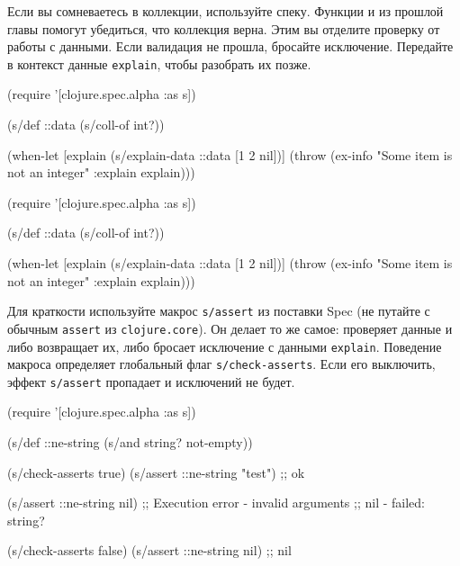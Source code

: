 
Если вы сомневаетесь в коллекции, используйте спеку. Функции  и
 из прошлой главы  помогут убедиться, что
коллекция верна. Этим вы отделите проверку от работы с данными. Если валидация
не прошла, бросайте исключение. Передайте в контекст данные \verb|explain|,
чтобы разобрать их позже.

\ifnarrow

\begin{english}
  \begin{clojure}
(require '[clojure.spec.alpha :as s])

(s/def ::data (s/coll-of int?))

(when-let [explain (s/explain-data
                     ::data
                     [1 2 nil])]
  (throw (ex-info
           "Some item is not an integer"
           {:explain explain})))
  \end{clojure}
\end{english}

\else

\begin{english}
  \begin{clojure}
(require '[clojure.spec.alpha :as s])

(s/def ::data (s/coll-of int?))

(when-let [explain (s/explain-data ::data [1 2 nil])]
  (throw (ex-info "Some item is not an integer"
                  {:explain explain})))
  \end{clojure}
\end{english}

\fi


Для краткости используйте макрос \verb|s/assert| из поставки Spec (не путайте с
обычным \verb|assert| из \verb|clojure.core|). Он делает то же самое: проверяет
данные и либо возвращает их, либо бросает исключение с данными
\verb|explain|. Поведение макроса определяет глобальный флаг
\verb|s/check-asserts|. Если его выключить, эффект \verb|s/assert| пропадает и
исключений не будет.

\ifnarrow

\begin{english}
  \begin{clojure}
(require '[clojure.spec.alpha :as s])

(s/def ::ne-string
  (s/and string? not-empty))

(s/check-asserts true)
(s/assert ::ne-string "test") ;; ok

(s/assert ::ne-string nil)
;; Execution error - invalid arguments
;; nil - failed: string?

(s/check-asserts false)
(s/assert ::ne-string nil) ;; nil
  \end{clojure}
\end{english}


